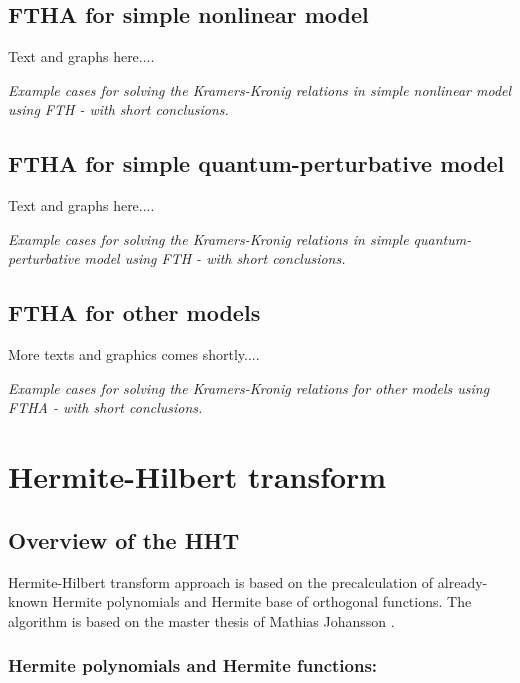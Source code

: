 \documentclass[12pt,twoside,a4paper]{article}
\numberwithin{equation}{subsection}
\numberwithin{figure}{subsection}
\begin{document}
\subsection{FTHA for simple nonlinear model} \label{chap:hartley_nlo}

Text and graphs here.... 

\textit{Example cases for solving the Kramers-Kronig relations in simple nonlinear model using FTH - with short conclusions.}

\subsection{FTHA for simple quantum-perturbative model} \label{chap:hartley_quantum}

Text and graphs here.... 

\textit{Example cases for solving the Kramers-Kronig relations in simple quantum-perturbative model using FTH - with short
conclusions.}

\subsection{FTHA for other models} \label{chap:hartley_other}

More texts and graphics comes shortly.... 

\textit{Example cases for solving the Kramers-Kronig relations for other models using FTHA - with short conclusions.}

\section{Hermite-Hilbert transform} \label{chap:hermite}

\subsection{Overview of the HHT}  \label{chap:hermite_overview}

Hermite-Hilbert transform approach is based on the precalculation of already-known Hermite polynomials and Hermite base of orthogonal
functions. The algorithm is based on the master thesis of Mathias Johansson \cite{johansson_hilbert}.

\subsubsection*{Hermite polynomials and Hermite functions:}
\end{document}

